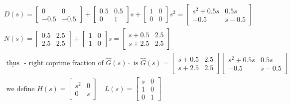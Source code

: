 \documentclass{article}
\begin{document}
\[
\begin{aligned}
    &D(s)=\left[\begin{array}{cc}
    0 & 0 \\
    -0.5 & -0.5
    \end{array}\right]+\left[\begin{array}{cc}
    0.5 & 0.5 \\
    0 & 1
    \end{array}\right] s+\left[\begin{array}{cc}
    1 & 0 \\
    0 & 0
    \end{array}\right] s^{2}=\left[\begin{array}{cc}
    s^{2}+0.5 s & 0.5 s \\
    -0.5 & s-0.5
    \end{array}\right]\\
    &N(s)=\left[\begin{array}{ll}
    0.5 & 2.5 \\
    2.5 & 2.5
    \end{array}\right]+\left[\begin{array}{ll}
    1 & 0 \\
    1 & 0
    \end{array}\right] s=\left[\begin{array}{ll}
    s+0.5 & 2.5 \\
    s+2.5 & 2.5
    \end{array}\right]\\
    &\underline{\text { thus }} \text { - right coprime fraction of } \hat{G}(s) \cdot \text { is } \hat{G}(s)=\left[\begin{array}{ll}
    s+0.5 & 2.5 \\
    s+2.5 & 2.5
    \end{array}\right]\left[\begin{array}{cc}
    s^{2}+0.5 s & 0.5 s \\
    -0.5 & s-0.5
    \end{array}\right]\\
    &\text { we define } H(s)=\left[\begin{array}{cc}
    s^{2} & 0 \\
    0 & s
    \end{array}\right] \quad L(s)=\left[\begin{array}{cc}
    s & 0 \\
    1 & 0 \\
    0 & 1
    \end{array}\right]
    \end{aligned}
    \]
\end{document}
